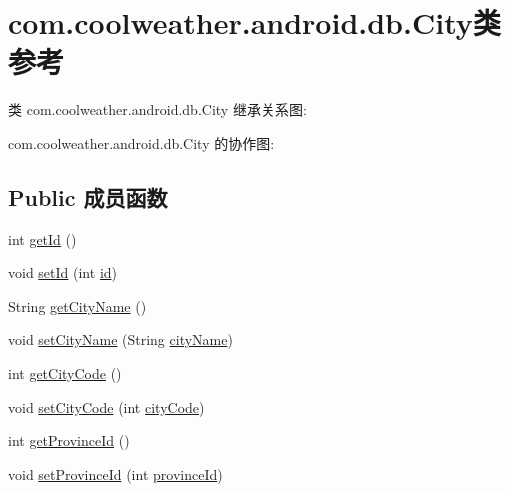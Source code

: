 \hypertarget{classcom_1_1coolweather_1_1android_1_1db_1_1_city}{}\section{com.\+coolweather.\+android.\+db.\+City类 参考}
\label{classcom_1_1coolweather_1_1android_1_1db_1_1_city}


类 com.\+coolweather.\+android.\+db.\+City 继承关系图\+:


com.\+coolweather.\+android.\+db.\+City 的协作图\+:
\subsection*{Public 成员函数}
\begin{DoxyCompactItemize}
\item 
int \mbox{\hyperlink{classcom_1_1coolweather_1_1android_1_1db_1_1_city_a89f2b20fca4db4bd2acf4a56191f1df7}{get\+Id}} ()
\item 
void \mbox{\hyperlink{classcom_1_1coolweather_1_1android_1_1db_1_1_city_aca401851f8de2af84030d7f4c9ebfd69}{set\+Id}} (int \mbox{\hyperlink{classcom_1_1coolweather_1_1android_1_1db_1_1_city_a26cc93496554fb90b788f7f229e9266d}{id}})
\item 
String \mbox{\hyperlink{classcom_1_1coolweather_1_1android_1_1db_1_1_city_ab3c66bcec789c71e46f2cbb5b2c1ae17}{get\+City\+Name}} ()
\item 
void \mbox{\hyperlink{classcom_1_1coolweather_1_1android_1_1db_1_1_city_a640cf59aa2a9156f117e5f414da4cbb4}{set\+City\+Name}} (String \mbox{\hyperlink{classcom_1_1coolweather_1_1android_1_1db_1_1_city_a0aa025df84b3ee11074a055d13e8240b}{city\+Name}})
\item 
int \mbox{\hyperlink{classcom_1_1coolweather_1_1android_1_1db_1_1_city_a4e1b3cfeb6e870603c4de09066751e46}{get\+City\+Code}} ()
\item 
void \mbox{\hyperlink{classcom_1_1coolweather_1_1android_1_1db_1_1_city_a5eea21afc5f204d11b845c21f9577db9}{set\+City\+Code}} (int \mbox{\hyperlink{classcom_1_1coolweather_1_1android_1_1db_1_1_city_a65f3070cb6f6595e46168d7fef4ab105}{city\+Code}})
\item 
int \mbox{\hyperlink{classcom_1_1coolweather_1_1android_1_1db_1_1_city_af901acf7b357f003594910baad7a980e}{get\+Province\+Id}} ()
\item 
void \mbox{\hyperlink{classcom_1_1coolweather_1_1android_1_1db_1_1_city_a9f6bdb1899f899db3bc2d860ecf4d137}{set\+Province\+Id}} (int \mbox{\hyperlink{classcom_1_1coolweather_1_1android_1_1db_1_1_city_aa37bb61864bed09cdc38fda357a77416}{province\+Id}})
\end{DoxyCompactItemize}
